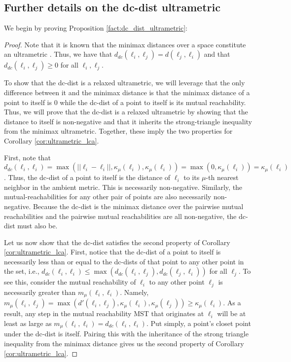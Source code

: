 \subsection{Further details on the dc-dist ultrametric}

We begin by proving Proposition \ref{fact:dc_dist_ultrametric}:

\DcDistUltra*

\begin{proof}\label{prf:dc_dist_ultrametric}
    Note that it is known that the minimax distances over a space constitute an ultrametric \citep{minimax_distance}. Thus, we have that $d_{dc}(\ell_i, \ell_j) = d(\ell_j, \ell_i)$ and that $d_{dc}(\ell_i, \ell_j) \geq 0$ for all $\ell_i, \ell_j$.
    
    To show that the dc-dist is a relaxed ultrametric, we will leverage that the only difference between it and the minimax distance is that the minimax distance of a point to itself is 0 while the dc-dist of a point to itself is its mutual reachability. Thus, we will prove that the dc-dist is a relaxed ultrametric by showing that the distance to itself is non-negative and that it inherits the strong-triangle inequality from the minimax ultrametric. Together, these imply the two properties for Corollary \ref{cor:ultrametric_lca}.
    
    First, note that $d_{dc}(\ell_i, \ell_i) = \max(||\ell_i - \ell_i||, \kappa_{\mu}(\ell_i), \kappa_{\mu}(\ell_i)) = \max(0, \kappa_{\mu}(\ell_i)) = \kappa_{\mu}(\ell_i)$. Thus, the dc-dist of a point to itself is the distance of $\ell_i$ to its $\mu$-th nearest neighbor in the ambient metric. This is necessarily non-negative. Similarly, the mutual-reachabilities for any other pair of points are also necessarily non-negative. Because the dc-dist is the minimax distance over the pairwise mutual reachabilities and the pairwise mutual reachabilities are all non-negative, the dc-dist must also be.

    Let us now show that the dc-dist satisfies the second property of Corollary \ref{cor:ultrametric_lca}. First, notice that the dc-dist of a point to itself is necessarily less than or equal to the dc-dists of that point to any other point in the set, i.e., $d_{dc}(\ell_i, \ell_i) \leq \max(d_{dc}(\ell_i, \ell_j), d_{dc}(\ell_j, \ell_i))$ for all $\ell_j$. To see this, consider the mutual reachability of $\ell_i$ to any other point $\ell_j$ is necessarily greater than $m_{\mu}(\ell_i, \ell_i)$. Namely, $m_{\mu}(\ell_i, \ell_j) = \max(d'(\ell_i, \ell_j), \kappa_{\mu}(\ell_i), \kappa_{\mu}(\ell_j)) \geq \kappa_{\mu}(\ell_i)$. As a result, any step in the mutual reachability MST that originates at $\ell_i$ will be at least as large as $m_{\mu}(\ell_i, \ell_i) = d_{dc}(\ell_i, \ell_i)$. Put simply, a point's closet point under the dc-dist is itself. Pairing this with the inheritance of the strong triangle inequality from the minimax distance gives us the second property of Corollary \ref{cor:ultrametric_lca}.
    

\end{proof}
